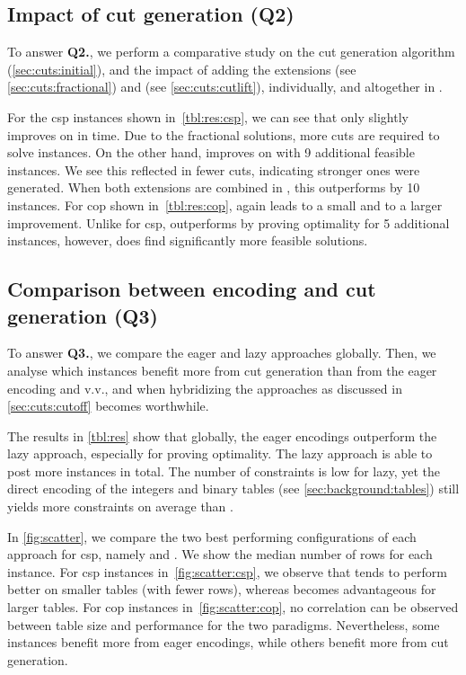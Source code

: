 \documentclass[a4paper,UKenglish,cleveref,autoref,thm-restate]{lipics-v2021}
\begin{document}
\subsection{Impact of cut generation (Q2)}
To answer \textbf{Q2.}, we perform a comparative study on the cut generation algorithm \lazyGenerate (\cref{sec:cuts:initial}), and the impact of adding the extensions \lazyFractional (see \cref{sec:cuts:fractional}) and \lazyCutlift (see \cref{sec:cuts:cutlift}), individually, and altogether in \lazyAll.

For the \gls{csp} instances shown in~\cref{tbl:res:csp}, we can see that \lazyFractional only slightly improves on \lazyGenerate in time.
Due to the fractional solutions, more cuts are required to solve instances.
On the other hand, \lazyCutlift improves on \lazyGenerate with 9 additional feasible instances.
We see this reflected in fewer cuts, indicating stronger ones were generated.
When both extensions are combined in \lazyAll, this outperforms \lazyCutlift by 10 instances.
For \gls{cop} shown in~\cref{tbl:res:cop}, again \lazyFractional leads to a small and \lazyCutlift to a larger improvement.
Unlike for \gls{csp}, \lazyCutlift outperforms \lazyAll by proving optimality for 5 additional instances, however, \lazyAll does find significantly more feasible solutions.


\subsection{Comparison between encoding and cut generation (Q3)}

To answer \textbf{Q3.}, we compare the eager and lazy approaches globally.
Then, we analyse which instances benefit more from cut generation than from the eager encoding and v.v., and when hybridizing the approaches as discussed in \cref{sec:cuts:cutoff} becomes worthwhile.

The results in \cref{tbl:res} show that globally, the eager encodings outperform the lazy approach, especially for proving optimality.
The lazy approach is able to post more instances in total.
The number of constraints is low for lazy, yet the direct encoding of the integers and binary tables (see \cref{sec:background:tables}) still yields more constraints on average than \baseGleb.

In \cref{fig:scatter}, we compare the two best performing configurations of each approach for \gls{csp}, namely \baseMddDomIncr and \lazyAll.
We show the median number of rows for each instance.
For \gls{csp} instances in~\cref{fig:scatter:csp}, we observe that \baseMddDomIncr tends to perform better on smaller tables (with fewer rows), whereas \lazyAll becomes advantageous for larger tables.
For \gls{cop} instances in~\cref{fig:scatter:cop}, no correlation can be observed between table size and performance for the two paradigms.
Nevertheless, some instances benefit more from eager encodings, while others benefit more from cut generation.
\end{document}
